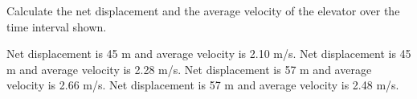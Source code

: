 \documentclass[]{exam}
\begin{document}
\begin{questions}
\begin{questions}
\question \label{ques:Unit02_Elevator2}

Calculate the net displacement and the average velocity of the elevator over the time interval shown.

\begin{choices}
\choice Net displacement is 45 m and average velocity is 2.10 m/s.
\choice Net displacement is 45 m and average velocity is 2.28 m/s.
\choice Net displacement is 57 m and average velocity is 2.66 m/s.
\CorrectChoice Net displacement is 57 m and average velocity is 2.48 m/s.
\end{choices}





\end{questions}







\end{questions}
\end{document}
